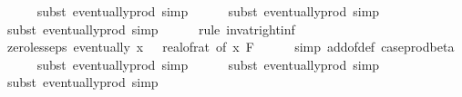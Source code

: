 \begin{isabellebody}
\ \ \ \ \isamarkupfalse%
\ {\isacharparenleft}{\kern0pt}subst\ eventually{\isacharunderscore}{\kern0pt}prod{}{\isacharprime}{\kern0pt}{\isacharcomma}{\kern0pt}\ simp{\isacharparenright}{\kern0pt}\isanewline
\ \ \ \ \isamarkupfalse%
\ {\isacharparenleft}{\kern0pt}subst\ eventually{\isacharunderscore}{\kern0pt}prod{}{\isacharprime}{\kern0pt}{\isacharcomma}{\kern0pt}\ simp{\isacharparenright}{\kern0pt}\isanewline
\ \ \ \ \isamarkupfalse%
\ {\isacharparenleft}{\kern0pt}subst\ eventually{\isacharunderscore}{\kern0pt}prod{}{\isacharprime}{\kern0pt}{\isacharcomma}{\kern0pt}\ simp{\isacharparenright}{\kern0pt}\isanewline
\ \ \ \ \isamarkupfalse%
\ {\isacharparenleft}{\kern0pt}rule\ inv{\isacharunderscore}{\kern0pt}at{\isacharunderscore}{\kern0pt}right{\isacharunderscore}{\kern0pt}{}{\isacharunderscore}{\kern0pt}inf{\isacharparenright}{\kern0pt}\isanewline
\isanewline
\ \ \isamarkupfalse%
\ zero{\isacharunderscore}{\kern0pt}less{\isacharunderscore}{\kern0pt}eps{\isacharcolon}{\kern0pt}\ {\isachardoublequoteopen}eventually\ {\isacharparenleft}{\kern0pt}{\isasymlambda}x{\isachardot}{\kern0pt}\ {}\ {\isacharless}{\kern0pt}\ {\isacharparenleft}{\kern0pt}real{\isacharunderscore}{\kern0pt}of{\isacharunderscore}{\kern0pt}rat\ {\isacharparenleft}{\kern0pt}{\isasymepsilon}{\isacharunderscore}{\kern0pt}of\ x{\isacharparenright}{\kern0pt}{\isacharparenright}{\kern0pt}{\isacharparenright}{\kern0pt}\ {\isacharquery}{\kern0pt}F{\isachardoublequoteclose}\isanewline
\ \ \ \ \isamarkupfalse%
\ {\isacharparenleft}{\kern0pt}simp\ add{\isacharcolon}{\kern0pt}{\isasymepsilon}{\isacharunderscore}{\kern0pt}of{\isacharunderscore}{\kern0pt}def\ case{\isacharunderscore}{\kern0pt}prod{\isacharunderscore}{\kern0pt}beta{\isacharprime}{\kern0pt}{\isacharparenright}{\kern0pt}\isanewline
\ \ \ \ \isamarkupfalse%
\ {\isacharparenleft}{\kern0pt}subst\ eventually{\isacharunderscore}{\kern0pt}prod{}{\isacharprime}{\kern0pt}{\isacharcomma}{\kern0pt}\ simp{\isacharparenright}{\kern0pt}\isanewline
\ \ \ \ \isamarkupfalse%
\ {\isacharparenleft}{\kern0pt}subst\ eventually{\isacharunderscore}{\kern0pt}prod{}{\isacharprime}{\kern0pt}{\isacharcomma}{\kern0pt}\ simp{\isacharparenright}{\kern0pt}\isanewline
\ \ \ \ \isamarkupfalse%
\ {\isacharparenleft}{\kern0pt}subst\ eventually{\isacharunderscore}{\kern0pt}prod{}{\isacharprime}{\kern0pt}{\isacharcomma}{\kern0pt}\ simp{\isacharparenright}{\kern0pt}\isanewline

\end{isabellebody}
